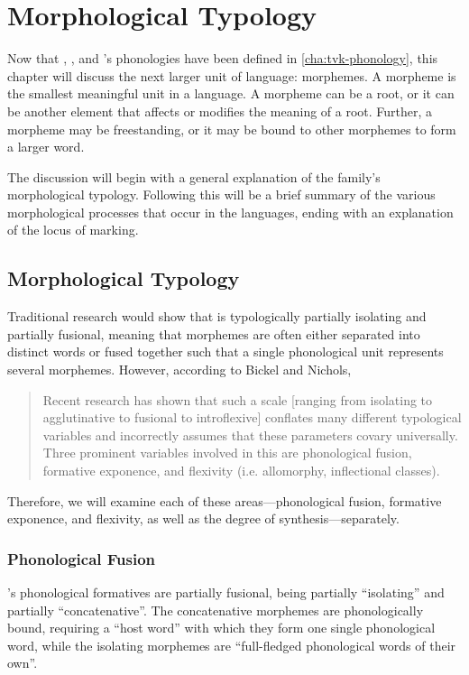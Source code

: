 \chapter{Morphological Typology}
\label{cha:tvk-morphological-typology}

Now that \langtvk, \langank, and \langrdk's phonologies have been defined in \autoref{cha:tvk-phonology}, this chapter will discuss the next larger unit of language: morphemes. A morpheme is the smallest meaningful unit in a language. A morpheme can be a root, or it can be another element that affects or modifies the meaning of a root. Further, a morpheme may be freestanding, or it may be bound to other morphemes to form a larger word.

The discussion will begin with a general explanation of the \langtvk{} family's morphological typology. Following this will be a brief summary of the various morphological processes that occur in the languages, ending with an explanation of the locus of marking.

\section{Morphological Typology}
\label{sec:tvk-typology}

Traditional research would show that \langtvk{} is typologically partially isolating and partially fusional, meaning that morphemes are often either separated into distinct words or fused together such that a single phonological unit represents several morphemes. However, according to Bickel and Nichols, \blockquote{Recent research has shown that such a scale [ranging from isolating to agglutinative to fusional to introflexive] conflates many different typological variables and incorrectly assumes that these parameters covary universally\autocite{Plank-1999,Bickel-and-Nichols-2005}. Three prominent variables involved in this are phonological fusion, formative exponence, and flexivity (i.e. allomorphy, inflectional classes).\autocite{wals-20}} Therefore, we will examine each of these areas---phonological fusion, formative exponence, and flexivity, as well as the degree of synthesis---separately.

\subsection{Phonological Fusion}
\label{sec:tvk-fusion}

\langtvk's phonological formatives are partially fusional, being partially \enquote{isolating} and partially \enquote{concatenative}\autocite{wals-20}. The concatenative morphemes are phonologically bound, requiring a \enquote{host word} with which they form one single phonological word, while the isolating morphemes are \enquote{full-fledged phonological words of their own}.

